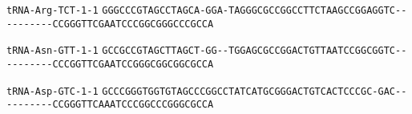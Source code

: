 \documentclass{article}
\newcommand{\rnabox}[1]{\colorbox{#1}{\texttt{#1}}}
\begin{document}
\vspace{-0.5mm}

\texttt{tRNA-Arg-TCT-1-1}
\rnabox{G}\rnabox{G}\rnabox{G}\rnabox{C}\rnabox{C}\rnabox{C}\rnabox{G}\rnabox{T}\rnabox{A}\rnabox{G}\rnabox{C}\rnabox{C}\rnabox{T}\rnabox{A}\rnabox{G}\rnabox{C}\rnabox{A}\rnabox{-}\rnabox{G}\rnabox{G}\rnabox{A}\rnabox{-}\rnabox{T}\rnabox{A}\rnabox{G}\rnabox{G}\rnabox{G}\rnabox{C}\rnabox{G}\rnabox{C}\rnabox{C}\rnabox{G}\rnabox{G}\rnabox{C}\rnabox{C}\rnabox{T}\rnabox{T}\rnabox{C}\rnabox{T}\rnabox{A}\rnabox{A}\rnabox{G}\rnabox{C}\rnabox{C}\rnabox{G}\rnabox{G}\rnabox{A}\rnabox{G}\rnabox{G}\rnabox{T}\rnabox{C}\rnabox{-}\rnabox{-}\rnabox{-}\rnabox{-}\rnabox{-}\rnabox{-}\rnabox{-}\rnabox{-}\rnabox{-}\rnabox{-}\rnabox{C}\rnabox{C}\rnabox{G}\rnabox{G}\rnabox{G}\rnabox{T}\rnabox{T}\rnabox{C}\rnabox{G}\rnabox{A}\rnabox{A}\rnabox{T}\rnabox{C}\rnabox{C}\rnabox{C}\rnabox{G}\rnabox{G}\rnabox{C}\rnabox{G}\rnabox{G}\rnabox{G}\rnabox{C}\rnabox{C}\rnabox{C}\rnabox{G}\rnabox{C}\rnabox{C}\rnabox{A}

\vspace{-0.5mm}

\texttt{tRNA-Asn-GTT-1-1}
\rnabox{G}\rnabox{C}\rnabox{C}\rnabox{G}\rnabox{C}\rnabox{C}\rnabox{G}\rnabox{T}\rnabox{A}\rnabox{G}\rnabox{C}\rnabox{T}\rnabox{T}\rnabox{A}\rnabox{G}\rnabox{C}\rnabox{T}\rnabox{-}\rnabox{G}\rnabox{G}\rnabox{-}\rnabox{-}\rnabox{T}\rnabox{G}\rnabox{G}\rnabox{A}\rnabox{G}\rnabox{C}\rnabox{G}\rnabox{C}\rnabox{C}\rnabox{G}\rnabox{G}\rnabox{A}\rnabox{C}\rnabox{T}\rnabox{G}\rnabox{T}\rnabox{T}\rnabox{A}\rnabox{A}\rnabox{T}\rnabox{C}\rnabox{C}\rnabox{G}\rnabox{G}\rnabox{C}\rnabox{G}\rnabox{G}\rnabox{T}\rnabox{C}\rnabox{-}\rnabox{-}\rnabox{-}\rnabox{-}\rnabox{-}\rnabox{-}\rnabox{-}\rnabox{-}\rnabox{-}\rnabox{-}\rnabox{C}\rnabox{C}\rnabox{C}\rnabox{G}\rnabox{G}\rnabox{T}\rnabox{T}\rnabox{C}\rnabox{G}\rnabox{A}\rnabox{A}\rnabox{T}\rnabox{C}\rnabox{C}\rnabox{G}\rnabox{G}\rnabox{G}\rnabox{C}\rnabox{G}\rnabox{G}\rnabox{C}\rnabox{G}\rnabox{G}\rnabox{C}\rnabox{G}\rnabox{C}\rnabox{C}\rnabox{A}

\vspace{-0.5mm}

\texttt{tRNA-Asp-GTC-1-1}
\rnabox{G}\rnabox{C}\rnabox{C}\rnabox{C}\rnabox{G}\rnabox{G}\rnabox{G}\rnabox{T}\rnabox{G}\rnabox{G}\rnabox{T}\rnabox{G}\rnabox{T}\rnabox{A}\rnabox{G}\rnabox{C}\rnabox{C}\rnabox{C}\rnabox{G}\rnabox{G}\rnabox{C}\rnabox{C}\rnabox{T}\rnabox{A}\rnabox{T}\rnabox{C}\rnabox{A}\rnabox{T}\rnabox{G}\rnabox{C}\rnabox{G}\rnabox{G}\rnabox{G}\rnabox{A}\rnabox{C}\rnabox{T}\rnabox{G}\rnabox{T}\rnabox{C}\rnabox{A}\rnabox{C}\rnabox{T}\rnabox{C}\rnabox{C}\rnabox{C}\rnabox{G}\rnabox{C}\rnabox{-}\rnabox{G}\rnabox{A}\rnabox{C}\rnabox{-}\rnabox{-}\rnabox{-}\rnabox{-}\rnabox{-}\rnabox{-}\rnabox{-}\rnabox{-}\rnabox{-}\rnabox{-}\rnabox{C}\rnabox{C}\rnabox{G}\rnabox{G}\rnabox{G}\rnabox{T}\rnabox{T}\rnabox{C}\rnabox{A}\rnabox{A}\rnabox{A}\rnabox{T}\rnabox{C}\rnabox{C}\rnabox{C}\rnabox{G}\rnabox{G}\rnabox{C}\rnabox{C}\rnabox{C}\rnabox{G}\rnabox{G}\rnabox{G}\rnabox{C}\rnabox{G}\rnabox{C}\rnabox{C}\rnabox{A}
\end{document}
